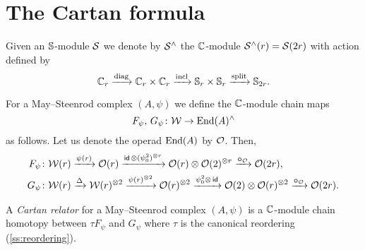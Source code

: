 
\section{The Cartan formula}\label{s:cartan}

Given an $\mathbb{S}$-module $\mathcal{S}$ we denote by $\mathcal{S}^\wedge$ the $\mathbb{C}$-module $\mathcal{S}^\wedge(r) = \mathcal{S}(2r)$ with
action defined by
\begin{equation}\label{eq:cyclic to 2-symetric}
	\mathbb{C}_r \xrightarrow{\mathrm{diag}}
	\mathbb{C}_r \times \mathbb{C}_r \xrightarrow{\mathrm{incl}}
	\mathbb{S}_r \times \mathbb{S}_r \xrightarrow{\mathrm{split}}
	\mathbb{S}_{2r}.
\end{equation}

For a May--Steenrod complex $(A,\psi)$ we define the $\mathbb{C}$-module chain maps
\[
F_\psi,\, G_\psi \colon \mathcal{W} \to \mathrm{End}(A)^\wedge
\]
as follows.
Let us denote the operad $\mathrm{End}(A)$ by $\mathcal{O}$.
Then,
\begin{align*}
	F_\psi \colon& \mathcal{W}(r) \xrightarrow{\psi(r)} \mathcal{O}(r) \xrightarrow{\mathsf{id}\, \otimes (\psi_0^2)^{\otimes r}}
	\mathcal{O}(r) \otimes \mathcal{O}(2)^{\otimes r} \xrightarrow{\bm{\circ}_{\mathcal{O}}}
	\mathcal{O}(2r), \\
	G_\psi \colon& \mathcal{W}(r) \xrightarrow{\Delta}
	\mathcal{W}(r)^{\otimes 2} \xrightarrow{\psi(r)^{\otimes 2}}
	\mathcal{O}(r)^{\otimes 2} \xrightarrow{\psi_0^2 \otimes\, \mathsf{id}}
	\mathcal{O}(2) \otimes \mathcal{O}(r)^{\otimes 2} \xrightarrow{\bm{\circ}_{\mathcal{O}}}
	\mathcal{O}(2r).
\end{align*}

\begin{definition}
	A \textit{Cartan relator} for a May--Steenrod complex $(A, \psi)$ is a $\mathbb{C}$-module chain homotopy between $\tau F_\psi$ and $G_\psi$ where $\tau$ is the canonical reordering (\cref{ss:reordering}).
\end{definition}

